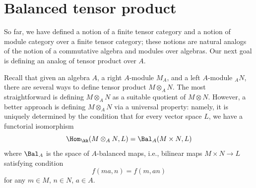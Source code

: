 %
%
%
%
%


\section{Balanced tensor product}\label{s:balanced-product}

So far, we have defined a notion of a finite tensor category and a notion of
module category over a finite tensor category; these notions are natural
analogs of the notion of a commutative algebra and modules over algebras. Our
next goal is defining an analog of tensor product over $A$.

Recall that given an algebra $A$, a right $A$-module $M_A$, and a left
$A$-module ${}_AN$, there are several ways to define tensor product $M
\otimes_A N$. The most straightforward is defining $M\otimes_A N$ as a suitable
quotient of $M\otimes N$. However, a better approach is defining $M\otimes_A N$
via a universal property: namely, it is uniquely determined by the condition
that for every vector space $L$, we have a functorial isomorphism
$$
\Hom_\kk(M\otimes_A N, L) = \Bal_A(M \times N, L)
$$
where $\Bal_A$ is the space of $A$-balanced maps, i.e., bilinear maps $M\times N
\to L$ satisfying condition
$$
f(ma, n) = f(m, an)
$$
for any $m\in M$, $n\in N$, $a\in A$.

